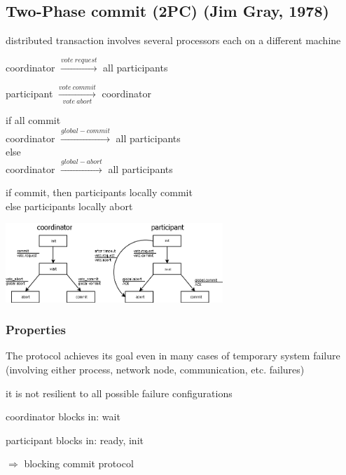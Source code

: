 \subsection{Two-Phase commit (2PC) (Jim Gray, 1978)}

\begin{compactitem}
	\item distributed transaction involves several processors each on a different machine
	\begin{compactenum}
		\item coordinator $\xrightarrow{vote\ request}$ all participants
		\item participant $\xrightarrow[vote\ abort]{vote\ commit}$ coordinator
		\item if all commit\\
		coordinator $\xrightarrow{global-commit}$ all participants\\
		else\\
		coordinator $\xrightarrow{global-abort}$ all participants\\
		\item if commit, then participants locally commit\\
		else participants locally abort\\
	\end{compactenum}
\end{compactitem}

\begin{minipage}{\linewidth}
	\centering\includegraphics[width=310px]{gfx/2pc.png}
	\label{img:2pc}
\end{minipage}

\subsubsection{Properties}
\begin{compactitem}
	\item The protocol achieves its goal even in many cases of temporary system failure (involving either process, network node, communication, etc. failures)
	\item it is not resilient to all possible failure configurations
	\begin{compactitem}
		\item coordinator blocks in: wait
		\item participant blocks in: ready, init
	\end{compactitem}
	\item $\Rightarrow$ blocking commit protocol
\end{compactitem}

